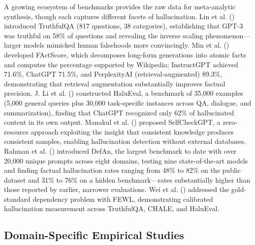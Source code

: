 \documentclass[
  11pt,
  a4paper,
]{article}
\begin{document}
A growing ecosystem of benchmarks provides the raw data for
meta-analytic synthesis, though each captures different facets of
hallucination. Lin et al. () introduced
TruthfulQA (817 questions, 38 categories), establishing that GPT-3 was
truthful on 58\% of questions and revealing the inverse scaling
phenomenon---larger models mimicked human falsehoods more convincingly.
Min et al. () developed FActScore, which
decomposes long-form generations into atomic facts and computes the
percentage supported by Wikipedia; InstructGPT achieved 71.6\%, ChatGPT
71.5\%, and PerplexityAI (retrieval-augmented) 89.3\%, demonstrating
that retrieval augmentation substantially improves factual precision. J.
Li et al. () constructed HaluEval, a
benchmark of 35,000 examples (5,000 general queries plus 30,000
task-specific instances across QA, dialogue, and summarization), finding
that ChatGPT recognized only 62\% of hallucinated content in its own
output. Manakul et al. () proposed
SelfCheckGPT, a zero-resource approach exploiting the insight that
consistent knowledge produces consistent samples, enabling hallucination
detection without external databases. Rahman et al.
() introduced DefAn, the largest
benchmark to date with over 20,000 unique prompts across eight domains,
testing nine state-of-the-art models and finding factual hallucination
rates ranging from 48\% to 82\% on the public dataset and 31\% to 76\%
on a hidden benchmark---rates substantially higher than those reported
by earlier, narrower evaluations. Wei et al.
() addressed the gold-standard dependency
problem with FEWL, demonstrating calibrated hallucination measurement
across TruthfulQA, CHALE, and HaluEval.

\subsection{Domain-Specific Empirical
Studies}\label{domain-specific-empirical-studies}
\end{document}
